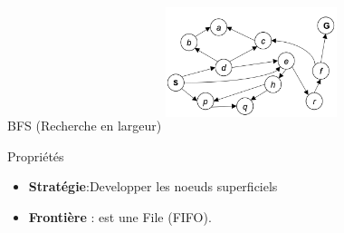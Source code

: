 \documentclass{beamer}
\begin{document}
\begin{frame}[t]{BFS (Recherche en largeur)}
 \centering 
 \includegraphics[width=5cm,height=4cm]{./images/tiny_graphe.png}

 \vspace*{1cm}
 \begin{block}{Propriétés}
    \begin{itemize}
      \small
    \item \textbf{Stratégie}:Developper les noeuds  \alert{superficiels}
    \item \textbf{Frontière} : est une \alert{File} (FIFO).
    \end{itemize} 
 \end{block}

\end{frame}
\end{document}

